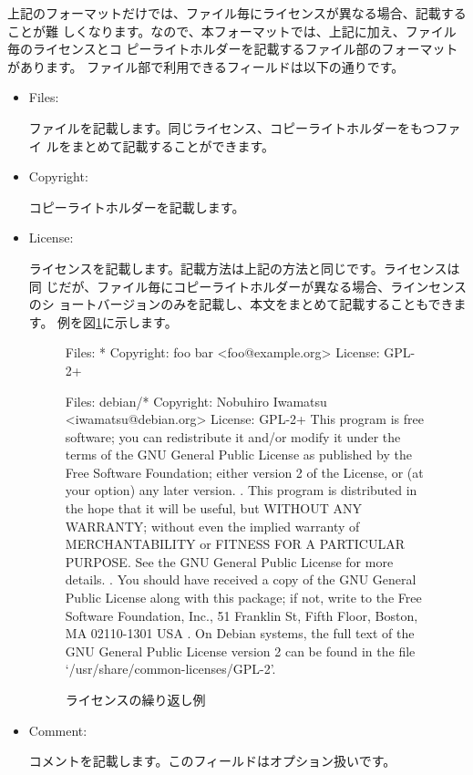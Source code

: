 \documentclass[mingoth,a4paper]{jsarticle}
\begin{document}
上記のフォーマットだけでは、ファイル毎にライセンスが異なる場合、記載することが難
しくなります。なので、本フォーマットでは、上記に加え、ファイル毎のライセンスとコ
ピーライトホルダーを記載するファイル部のフォーマットがあります。
ファイル部で利用できるフィールドは以下の通りです。
\begin{itemize}
  \item  Files:

         ファイルを記載します。同じライセンス、コピーライトホルダーをもつファイ
         ルをまとめて記載することができます。
  \item  Copyright:

         コピーライトホルダーを記載します。
  \item  License:

         ライセンスを記載します。記載方法は上記の方法と同じです。ライセンスは同
         じだが、ファイル毎にコピーライトホルダーが異なる場合、ラインセンスのシ
         ョートバージョンのみを記載し、本文をまとめて記載することもできます。
         例を図\ref{fig:repeat-license}に示します。

\begin{figure}[htbp]
\begin{center}
\begin{commandline}
Files: *
Copyright: foo bar <foo@example.org>
License: GPL-2+

Files: debian/*
Copyright: Nobuhiro Iwamatsu <iwamatsu@debian.org>
License: GPL-2+
 This program is free software; you can redistribute it
 and/or modify it under the terms of the GNU General Public
 License as published by the Free Software Foundation; either
 version 2 of the License, or (at your option) any later
 version.
 .
 This program is distributed in the hope that it will be
 useful, but WITHOUT ANY WARRANTY; without even the implied
 warranty of MERCHANTABILITY or FITNESS FOR A PARTICULAR
 PURPOSE.  See the GNU General Public License for more
 details.
 .
 You should have received a copy of the GNU General Public
 License along with this package; if not, write to the Free
 Software Foundation, Inc., 51 Franklin St, Fifth Floor,
 Boston, MA  02110-1301 USA
 .
 On Debian systems, the full text of the GNU General Public
 License version 2 can be found in the file
 `/usr/share/common-licenses/GPL-2'.
\end{commandline}
\end{center}
\caption{ライセンスの繰り返し例}
\label{fig:repeat-license}
\end{figure}


  \item  Comment:

         コメントを記載します。このフィールドはオプション扱いです。
\end{itemize}
\end{document}
